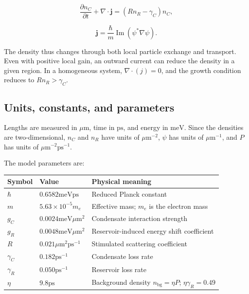 \documentclass[12pt,a4paper]{article}
\begin{document}
\begin{equation}\label{eq:3}
\frac{\partial n_C}{\partial t}+\nabla\cdot\mathbf j=(Rn_R-\gamma_C)n_C,\end{equation}

\begin{equation}\label{eq:4}
\mathbf j=\frac{\hbar}{m}\operatorname{Im}(\psi^*\nabla\psi).\end{equation}

The density thus changes through both local particle exchange and transport. Even with positive local gain, an outward current can reduce the density in a given region. In a homogeneous system, $\nabla\!\cdot(j)=0$, and the growth condition reduces to $R n_{R}>\gamma_{C}$.

\subsection{Units, constants, and parameters}\label{sec:2.4}

Lengths are measured in $\mu\mathrm m$, time in $\mathrm{ps}$, and energy in $\mathrm{meV}$. Since the densities are two-dimensional, $n_{C}$ and $n_{R}$ have units of $\mu\mathrm m^{-2}$, $\psi$ has units of $\mu\mathrm m^{-1}$, and $P$ has units of $\mu\mathrm m^{-2} \mathrm{ps}^{-1}$.

The model parameters are:

\begin{center}\small\begin{tabular}{>{\raggedright\arraybackslash}p{}>{\raggedright\arraybackslash}p{}>{\raggedright\arraybackslash}p{}}\toprule
\textbf{Symbol} & \textbf{Value} & \textbf{Physical meaning}\\\midrule
$\hbar$ & $0.6582 \mathrm{meV} \mathrm{ps}$ & Reduced Planck constant\\
$m$ & $5.63\times 10^{-5} m_{e}$ & Effective mass; $m_{e}$ is the electron mass\\
$g_{C}$ & $0.0024 \mathrm{meV} \mu\mathrm m^{2}$ & Condensate interaction strength\\
$g_{R}$ & $0.0048 \mathrm{meV} \mu\mathrm m^{2}$ & Reservoir-induced energy shift coefficient\\
$R$ & $0.021 \mu\mathrm m^{2} \mathrm{ps}^{-1}$ & Stimulated scattering coefficient\\
$\gamma_{C}$ & $0.182 \mathrm{ps}^{-1}$ & Condensate loss rate\\
$\gamma_{R}$ & $0.050 \mathrm{ps}^{-1}$ & Reservoir loss rate\\
$\eta$ & $9.8 \mathrm{ps}$ & Background density $n_{\mathrm{bg}}=\eta P$; $\eta \gamma_{R}=0.49$\\
\bottomrule\end{tabular}\end{center}
\end{document}
